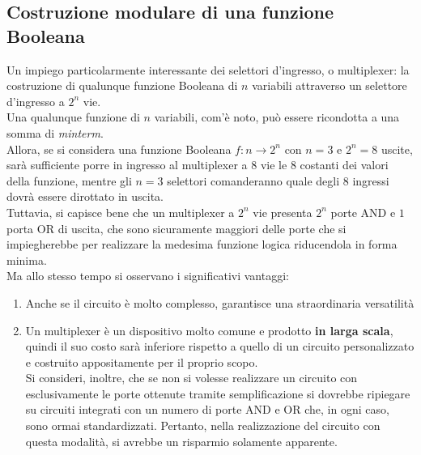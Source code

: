 \documentclass[a4paper]{extarticle}
\begin{document}
\subsection{Costruzione modulare di una funzione Booleana}
Un impiego particolarmente interessante dei selettori d’ingresso, o multiplexer: la costruzione di qualunque funzione Booleana di \(n\) variabili attraverso un selettore d’ingresso a \(2^n\) vie.\\
Una qualunque funzione di \(n\) variabili, com'è noto, può essere ricondotta a una somma di \textit{minterm}.\\
Allora, se si considera una funzione Booleana \(f : n \rightarrow 2^n\) con \(n = 3\) e \(2^n = 8\) uscite, sarà sufficiente porre in ingresso al multiplexer a \(8\) vie le \(8\) costanti dei valori della funzione, mentre gli \(n = 3\) selettori comanderanno quale degli \(8\) ingressi dovrà essere dirottato in uscita.\\
Tuttavia, si capisce bene che un multiplexer a \(2^n\) vie presenta \(2^n\) porte AND e \(1\) porta OR di uscita, che sono sicuramente maggiori delle porte che si impiegherebbe per realizzare la medesima funzione logica riducendola in forma minima.\\
Ma allo stesso tempo si osservano i significativi vantaggi:
\begin{enumerate}
    \item Anche se il circuito è molto complesso, garantisce una straordinaria versatilità
    \item Un multiplexer è un dispositivo molto comune e prodotto \textbf{in larga scala}, quindi il suo costo sarà inferiore rispetto a quello di un circuito personalizzato e costruito appositamente per il proprio scopo.\\
    Si consideri, inoltre, che se non si volesse realizzare un circuito con esclusivamente le porte ottenute tramite semplificazione si dovrebbe ripiegare su circuiti integrati con un numero di porte AND e OR che, in ogni caso, sono ormai standardizzati. Pertanto, nella realizzazione del circuito con questa modalità, si avrebbe un risparmio solamente apparente.
\end{enumerate}
\end{document}
